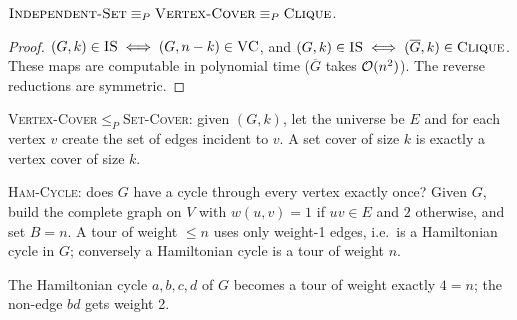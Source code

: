 \begin{theorem}
$\textsc{Independent-Set}\equiv_P\textsc{Vertex-Cover}\equiv_P\textsc{Clique}$.
\end{theorem}
\begin{proof}
$(G,k)\in\textsc{IS}\iff(G,n-k)\in\textsc{VC}$, and $(G,k)\in\textsc{IS}\iff(\overline G,k)\in\textsc{Clique}$. These maps are computable in polynomial time
($\overline G$ takes $\mathcal{O}(n^2)$). The reverse reductions are symmetric.
\end{proof}

\begin{example}
\textsc{Vertex-Cover}$\le_P$\textsc{Set-Cover}: given $(G,k)$, let the universe be $E$ and for each vertex $v$ create the set of edges incident to $v$.
A set cover of size $k$ is exactly a vertex cover of size $k$.
\end{example}

\begin{example}
\textsc{Ham-Cycle}: does $G$ have a cycle through every vertex exactly once? Given $G$, build the complete graph on $V$ with $w(u,v)=1$ if $uv\in E$ and $2$ otherwise, and set $B=n$.
A tour of weight $\le n$ uses only weight-1 edges, i.e.\ is a Hamiltonian cycle in $G$; conversely a Hamiltonian cycle is a tour of weight $n$.
\end{example}

\begin{center}
\end{center}
The Hamiltonian cycle $a,b,c,d$ of $G$ becomes a tour of weight exactly
$4=n$; the non-edge $bd$ gets weight 2.

